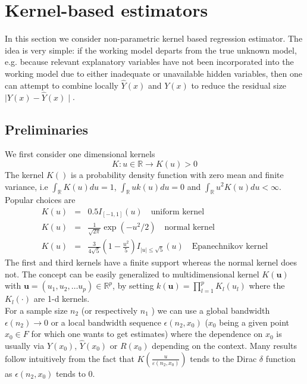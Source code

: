 \documentclass[a4paper,12pt,leqno, titlepage]{article}
\newcommand{\R}{\mathbb{R}}
\begin{document}
\section{Kernel-based estimators}\label{kernelbased}
In this section we consider non-parametric kernel based regression estimator. The idea is very simple: if the working model departs from the true unknown model, e.g. because relevant explanatory variables have not been incorporated into the working model due to either inadequate or unavailable hidden variables, then one can attempt to combine locally $\hat{Y}(x)$ and $Y(x)$ to reduce the residual size $\mid Y(x)-\hat{Y}(x)\mid $.\\
\subsection{Preliminaries}\label{preliminaries}
We first consider one dimensional kernels
\begin{equation}
K: u\in{\R}\rightarrow K(u)>0
\end{equation}
The kernel $K()$ is a probability density function with zero mean and finite variance, i.e $\int_\R K(u)du=1$, $\int_\R uk(u)du=0$ and $\int_\R u^2K(u)du <\infty$. Popular choices are
\begin{eqnarray}\label{threekernels}
K(u)&=& 0.5 I_{[-1,1]}(u)\quad \text{uniform kernel} \nonumber \\
K(u)&=& \frac{1}{\sqrt{2\pi}}\exp(-u^2/2)  \quad \text{normal kernel} \nonumber \\
K(u)&=& \frac{3}{4\sqrt{5}}(1-\frac{u^2}{5})I_{\mid u \mid \le \sqrt{5}}(u)\quad \text{Epanechnikov kernel}
\end{eqnarray}
The first and third kernels have a finite support whereas the normal kernel does not. The concept can be easily generalized to multidimensional kernel $K(\pmb{u})$ with $\pmb{u}=(u_1,u_2,\ldots u_p)\in{\R}^p$, by setting $k(\pmb{u})= \prod_{l=1}^pK_l(u_l)$ where the $K_l(\cdot)$ are 1-d kernels.\\
For a sample size $n_2$ (or respectively $n_1$ ) we can use a global bandwidth $\epsilon(n_2)\rightarrow 0$ or a local bandwidth sequence $\epsilon(n_2,x_0)$ ($x_0$ being a given point $x_0\in{F}$ for which one wants to get estimates) where the dependence on $x_0$ is usually via $Y(x_0)$, $\hat{Y}(x_0)$ or $R(x_0)$ depending on the context. Many results follow intuitively from the fact that $K(\frac{u}{\varepsilon(n_2,x_0)})$ tends to the Dirac $\delta$ function as $\epsilon(n_2,x_0)$ tends to $0$. \\
\end{document}

